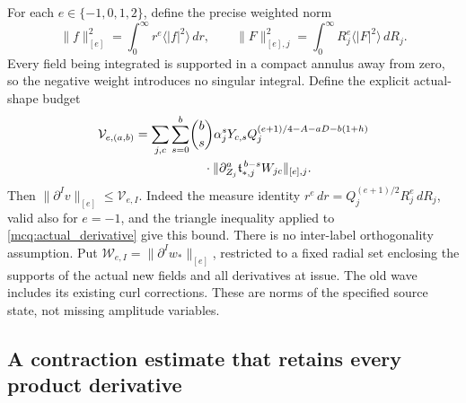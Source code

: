 For each \(e\in\{-1,0,1,2\}\), define the precise weighted norm
\[
 \|f\|_{[e]}^2=\int_0^\infty r^e\langle |f|^2\rangle\,dr,\qquad
 \|F\|_{[e],j}^2=\int_0^\infty R_j^e\langle |F|^2\rangle\,dR_j.
\]
Every field being integrated is supported in a compact annulus away
from zero, so the negative weight introduces no singular integral.
Define the explicit actual-shape budget
\begin{equation}\label{mcq:V}
\begin{split}
 \mathcal V_{e,(a,b)}
 =\sum_{j,c}\sum_{s=0}^b&
 \binom bs \alpha_j^sY_{c,s}
 Q_j^{(e+1)/4-A-aD-b(1+h)}\\
 &\hspace{4mm}\cdot
 \|\partial_{Z_j}^a\mathfrak t_{*,j}^{\,b-s}W_{jc}\|_{[e],j}.
\end{split}
\end{equation}
Then \(\|\partial^I v\|_{[e]}\le\mathcal V_{e,I}\).
Indeed the measure identity
\(r^e\,dr=Q_j^{(e+1)/2}R_j^e\,dR_j\), valid also for \(e=-1\),
and the triangle inequality applied to \eqref{mcq:actual_derivative}
give this bound. There is no inter-label orthogonality assumption.
Put \(\mathcal W_{e,I}=\|\partial^I w_*\|_{[e]}\), restricted to a
fixed radial set enclosing the supports of the actual new fields
and all derivatives at issue. The old wave includes its existing curl
corrections. These are norms of the specified source state, not missing
amplitude variables.

\subsection{A contraction estimate that retains every product derivative}

